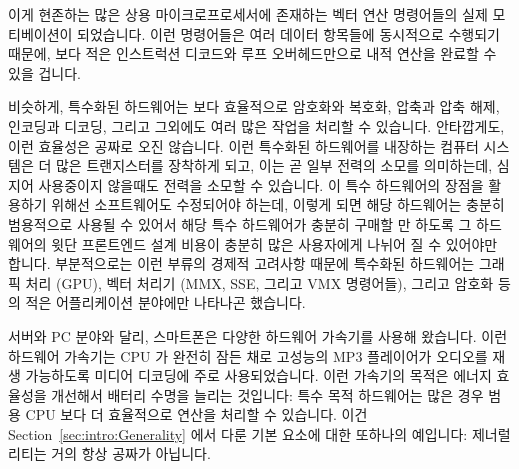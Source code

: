 이게 현존하는 많은 상용 마이크로프로세서에 존재하는 벡터 연산 명령어들의 실제
모티베이션이 되었습니다.
이런 명령어들은 여러 데이터 항목들에 동시적으로 수행되기 때문에, 보다 적은
인스트럭션 디코드와 루프 오버헤드만으로 내적 연산을 완료할 수 있을 겁니다.

\iffalse
This is in fact the motivation for the vector instructions present in
many commodity microprocessors.
Because these instructions operate on multiple data items simultaneously,
they would permit a dot product to be computed with less instruction-decode
and loop overhead.
\fi

비슷하게, 특수화된 하드웨어는 보다 효율적으로 암호화와 복호화, 압축과 압축
해제, 인코딩과 디코딩, 그리고 그외에도 여러 많은 작업을 처리할 수 있습니다.
안타깝게도, 이런 효율성은 공짜로 오진 않습니다.
이런 특수화된 하드웨어를 내장하는 컴퓨터 시스템은 더 많은 트랜지스터를 장착하게
되고, 이는 곧 일부 전력의 소모를 의미하는데, 심지어 사용중이지 않을때도 전력을
소모할 수 있습니다.
이 특수 하드웨어의 장점을 활용하기 위해선 소프트웨어도 수정되어야 하는데,
이렇게 되면 해당 하드웨어는 충분히 범용적으로 사용될 수 있어서 해당 특수
하드웨어가 충분히 구매할 만 하도록 그 하드웨어의 윗단 프론트엔드 설계 비용이
충분히 많은 사용자에게 나뉘어 질 수 있어야만 합니다.
부분적으로는 이런 부류의 경제적 고려사항 때문에 특수화된 하드웨어는 그래픽 처리
(GPU), 벡터 처리기 (MMX, SSE, 그리고 VMX 명령어들), 그리고 암호화 등의 적은
어플리케이션 분야에만 나타나곤 했습니다.

\iffalse
Similarly, specialized hardware can more efficiently encrypt and decrypt,
compress and decompress, encode and decode, and many other tasks besides.
Unfortunately, this efficiency does not come for free.
A computer system incorporating this specialized hardware will contain
more transistors, which will consume some power even when not in use.
Software must be modified to take advantage of this specialized hardware,
and this specialized hardware must be sufficiently generally useful
that the high up-front hardware-design costs can be spread over enough
users to make the specialized hardware affordable.
In part due to these sorts of economic considerations, specialized
hardware has thus far appeared only for a few application areas,
including graphics processing (GPUs), vector processors (MMX, SSE,
and VMX instructions), and, to a lesser extent, encryption.
\fi

서버와 PC 분야와 달리, 스마트폰은 다양한 하드웨어 가속기를 사용해 왔습니다.
이런 하드웨어 가속기는 CPU 가 완전히 잠든 채로 고성능의 MP3 플레이어가 오디오를
재생 가능하도록 미디어 디코딩에 주로 사용되었습니다.
이런 가속기의 목적은 에너지 효율성을 개선해서 배터리 수명을 늘리는 것입니다:
특수 목적 하드웨어는 많은 경우 범용 CPU 보다 더 효율적으로 연산을 처리할 수
있습니다.
이건 Section~\ref{sec:intro:Generality} 에서 다룬 기본 요소에 대한 또하나의
예입니다: 제너럴리티는 거의 항상 공짜가 아닙니다.


